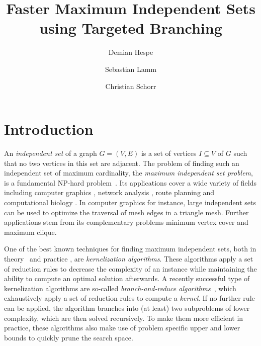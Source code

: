 \documentclass[a4paper,UKenglish,cleveref, autoref, thm-restate]{lipics-v2021}
\title{Faster Maximum Independent Sets using Targeted Branching} %
\author{Demian Hespe}{Karlsruhe Institute of Technology, Institute for
  Theoretical Informatics, Germany}{hespe@kit.edu}{}{}
\author{Sebastian Lamm}{Karlsruhe Institute of Technology, Institute for
  Theoretical Informatics, Germany}{lamm@kit.edu}{}{\todo{Add funding}}
\author{Christian Schorr}{Karlsruhe Institute of Technology, Institute for
  Theoretical Informatics, Germany}{christian.schorr@student.kit.edu}{}{}
\begin{document}
\maketitle

\begin{abstract}
\end{abstract}

\newpage

\section{Introduction}

An \emph{independent set} of a graph $G = (V,E)$ is a set of vertices $I \subseteq V$ of $G$ such that no two vertices in this set are adjacent.
The problem of finding such an independent set of maximum cardinality, the \emph{maximum independent set problem}, is a fundamental NP-hard problem~\cite{Garey1974}.
Its applications cover a wide variety of fields including computer graphics \cite{CG}, network analysis \cite{NW}, route planning \cite{RP} and computational biology \cite{BIO1, BIO2}.
In computer graphics for instance, large independent sets can be used to optimize the traversal of mesh edges in a triangle mesh.
Further applications stem from its complementary problems minimum vertex cover and maximum clique.

One of the best known techniques for finding maximum independent sets, both in theory~\cite{XiaoNagamochi, ChenXiaKanj} and practice \cite{AkibaIwata}, are \emph{kernelization algorithms}.
These algorithms apply a set of reduction rules to decrease the complexity of an instance while maintaining the ability to compute an optimal solution afterwards.
A recently successful type of kernelization algorithms are so-called \emph{branch-and-reduce algorithms}~\cite{AkibaIwata,WGYC}, which exhaustively apply a set of reduction rules to compute a \emph{kernel}.
If no further rule can be applied, the algorithm branches into (at least) two subproblems of lower complexity, which are then solved recursively.
To make them more efficient in practice, these algorithms also make use of problem specific upper and lower bounds to quickly prune the search space.
\end{document}

